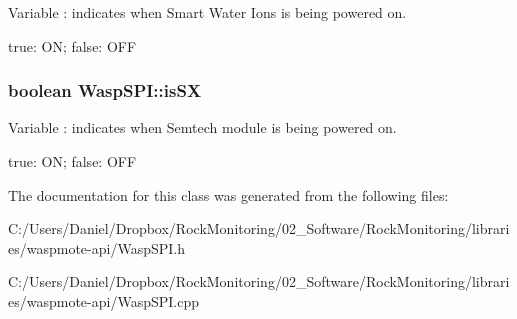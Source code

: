 Variable \+: indicates when Smart Water Ions is being powered on. 

true\+: ON; false\+: O\+FF 
\subsubsection[{\texorpdfstring{is\+SX}{isSX}}]{\setlength{\rightskip}{0pt plus 5cm}boolean Wasp\+S\+P\+I\+::is\+SX}\hypertarget{class_wasp_s_p_i_a859e91c0a90cae6c14c5a0ca97c3ceb0}{}\label{class_wasp_s_p_i_a859e91c0a90cae6c14c5a0ca97c3ceb0}


Variable \+: indicates when Semtech module is being powered on. 

true\+: ON; false\+: O\+FF 

The documentation for this class was generated from the following files\+:\begin{DoxyCompactItemize}
\item 
C\+:/\+Users/\+Daniel/\+Dropbox/\+Rock\+Monitoring/02\+\_\+\+Software/\+Rock\+Monitoring/libraries/waspmote-\/api/Wasp\+S\+P\+I.\+h\item 
C\+:/\+Users/\+Daniel/\+Dropbox/\+Rock\+Monitoring/02\+\_\+\+Software/\+Rock\+Monitoring/libraries/waspmote-\/api/Wasp\+S\+P\+I.\+cpp\end{DoxyCompactItemize}
